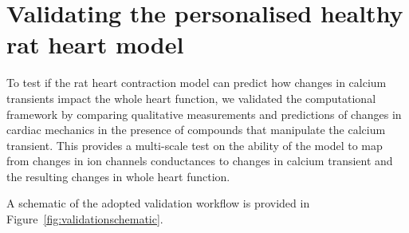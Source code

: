 %
%
%
\section{Validating the personalised healthy rat heart model}\label{sec:ch6validating_the_personalised_healthy_rat_heart_model}
To test if the rat heart contraction model can predict how changes in calcium transients impact the whole heart function, we validated the computational framework by comparing qualitative measurements and predictions of changes in cardiac mechanics in the presence of compounds that manipulate the calcium transient. This provides a multi-scale test on the ability of the model to map from changes in ion channels conductances to changes in calcium transient and the resulting changes in whole heart function.

\vspace{0.2cm}\noindent
A schematic of the adopted validation workflow is provided in Figure~\ref{fig:validationschematic}.

